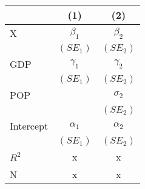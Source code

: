 \begin{tabular}{lcc}
\toprule
               & (1) & (2)     \\ %
\midrule
X            & $\beta_{1}$  & $\beta_{2} $   \\ %
             & $(SE_{1})$   & $(SE_{2})$ \\ %
GDP          & $\gamma_{1}$ & $\gamma_{2}$    \\
             & $(SE_{1})$   & $(SE_{2})$ \\
POP          &              & $\sigma_{2} $   \\
             &              & $(SE_{2})$ \\
Intercept    & $\alpha_{1}$ & $\alpha_{2} $   \\
             & $(SE_{1})$  & $(SE_{2})$ \\
\midrule
$R^2$      & x& x\\ %
N              &x & x\\ %
\bottomrule
\end{tabular}